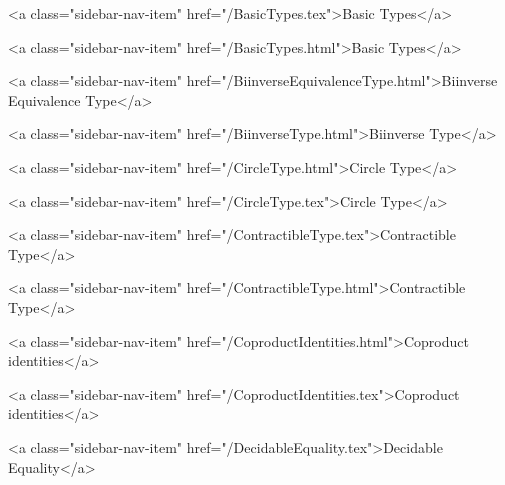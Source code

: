       
        
          <a class="sidebar-nav-item" href="/BasicTypes.tex">Basic Types</a>
        
      
    
      
        
          <a class="sidebar-nav-item" href="/BasicTypes.html">Basic Types</a>
        
      
    
      
        
          <a class="sidebar-nav-item" href="/BiinverseEquivalenceType.html">Biinverse Equivalence Type</a>
        
      
    
      
        
          <a class="sidebar-nav-item" href="/BiinverseType.html">Biinverse Type</a>
        
      
    
      
        
          <a class="sidebar-nav-item" href="/CircleType.html">Circle Type</a>
        
      
    
      
        
          <a class="sidebar-nav-item" href="/CircleType.tex">Circle Type</a>
        
      
    
      
        
          <a class="sidebar-nav-item" href="/ContractibleType.tex">Contractible Type</a>
        
      
    
      
        
          <a class="sidebar-nav-item" href="/ContractibleType.html">Contractible Type</a>
        
      
    
      
        
          <a class="sidebar-nav-item" href="/CoproductIdentities.html">Coproduct identities</a>
        
      
    
      
        
          <a class="sidebar-nav-item" href="/CoproductIdentities.tex">Coproduct identities</a>
        
      
    
      
        
          <a class="sidebar-nav-item" href="/DecidableEquality.tex">Decidable Equality</a>
        
